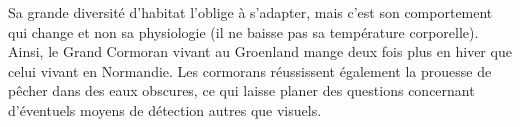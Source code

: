 \documentclass[12pt]{article}
\begin{document}
Sa grande diversité d'habitat l'oblige à s'adapter, mais c'est son comportement qui change et non sa physiologie (il ne baisse pas sa température corporelle). Ainsi, le Grand Cormoran vivant au Groenland mange deux fois plus en hiver que celui vivant en Normandie. Les cormorans réussissent également la prouesse de pêcher dans des eaux obscures, ce qui laisse planer des questions concernant d'éventuels moyens de détection autres que visuels.

\end{document}
